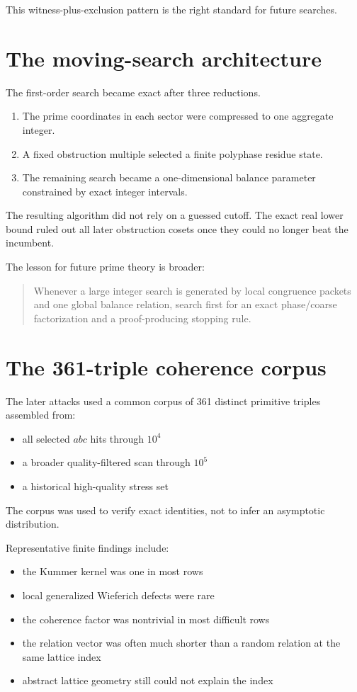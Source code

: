 This witness-plus-exclusion pattern is the right standard for future searches.

\section{The moving-search architecture}
The first-order search became exact after three reductions.

\begin{enumerate}[leftmargin=1.5em]
\item The prime coordinates in each sector were compressed to one aggregate integer.
\item A fixed obstruction multiple selected a finite polyphase residue state.
\item The remaining search became a one-dimensional balance parameter constrained by exact integer intervals.
\end{enumerate}

The resulting algorithm did not rely on a guessed cutoff. The exact real lower bound ruled out all later obstruction cosets once they could no longer beat the incumbent.

The lesson for future prime theory is broader:

\begin{quote}
Whenever a large integer search is generated by local congruence packets and one global balance relation, search first for an exact phase/coarse factorization and a proof-producing stopping rule.
\end{quote}

\section{The 361-triple coherence corpus}
The later attacks used a common corpus of 361 distinct primitive triples assembled from:
\begin{itemize}[leftmargin=1.5em]
\item all selected $abc$ hits through $10^4$
\item a broader quality-filtered scan through $10^5$
\item a historical high-quality stress set
\end{itemize}
The corpus was used to verify exact identities, not to infer an asymptotic distribution.

Representative finite findings include:
\begin{itemize}[leftmargin=1.5em]
\item the Kummer kernel was one in most rows
\item local generalized Wieferich defects were rare
\item the coherence factor was nontrivial in most difficult rows
\item the relation vector was often much shorter than a random relation at the same lattice index
\item abstract lattice geometry still could not explain the index
\end{itemize}

